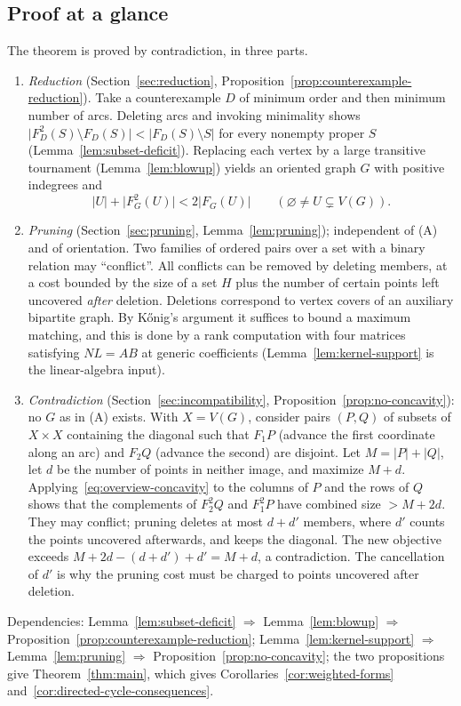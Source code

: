 \documentclass[11pt]{article}
\theoremstyle{remark}
\newcommand{\abs}[1]{\lvert #1\rvert}
\begin{document}
\subsection*{Proof at a glance}
The theorem is proved by contradiction, in three parts.
\begin{enumerate}[label=\textup{(\Alph*)},leftmargin=*]
\item \emph{Reduction} (Section~\ref{sec:reduction},
Proposition~\ref{prop:counterexample-reduction}). Take a counterexample $D$ of
minimum order and then minimum number of arcs. Deleting arcs and invoking
minimality shows $\abs{F_D^2(S)\setminus F_D(S)}<\abs{F_D(S)\setminus S}$ for
every nonempty proper $S$ (Lemma~\ref{lem:subset-deficit}). Replacing each
vertex by a large transitive tournament (Lemma~\ref{lem:blowup}) yields an
oriented graph $G$ with positive indegrees and
\begin{equation}\label{eq:overview-concavity}
 \abs{U}+\abs{F_G^2(U)}<2\abs{F_G(U)}\qquad(\varnothing\ne U\subsetneq V(G)).
\end{equation}
\item \emph{Pruning} (Section~\ref{sec:pruning}, Lemma~\ref{lem:pruning});
independent of (A) and of orientation. Two families of ordered pairs over a set
with a binary relation may ``conflict''. All conflicts can be removed by
deleting members, at a cost bounded by the size of a set $H$ plus the number of
certain points left uncovered \emph{after} deletion. Deletions correspond to
vertex covers of an auxiliary bipartite graph. By K\H{o}nig's argument it
suffices to bound a maximum matching, and this is done by a rank computation
with four matrices satisfying $NL=AB$ at generic coefficients
(Lemma~\ref{lem:kernel-support} is the linear-algebra input).
\item \emph{Contradiction} (Section~\ref{sec:incompatibility},
Proposition~\ref{prop:no-concavity}): no $G$ as in (A) exists. With $X=V(G)$,
consider pairs $(P,Q)$ of subsets of $X\times X$ containing the diagonal such
that $F_1P$ (advance the first coordinate along an arc) and $F_2Q$ (advance the
second) are disjoint. Let $M=\abs P+\abs Q$, let $d$ be the number of points in
neither image, and maximize $M+d$. Applying~\eqref{eq:overview-concavity} to
the columns of $P$ and the rows of $Q$ shows that the complements of $F_2^2Q$
and $F_1^2P$ have combined size $>M+2d$. They may conflict; pruning deletes at
most $d+d'$ members, where $d'$ counts the points uncovered afterwards, and
keeps the diagonal. The new objective exceeds $M+2d-(d+d')+d'=M+d$, a
contradiction. The cancellation of $d'$ is why the pruning cost must be charged
to points uncovered after deletion.
\end{enumerate}
Dependencies: Lemma~\ref{lem:subset-deficit} $\Rightarrow$
Lemma~\ref{lem:blowup} $\Rightarrow$
Proposition~\ref{prop:counterexample-reduction};
Lemma~\ref{lem:kernel-support} $\Rightarrow$ Lemma~\ref{lem:pruning}
$\Rightarrow$ Proposition~\ref{prop:no-concavity}; the two propositions give
Theorem~\ref{thm:main}, which gives Corollaries~\ref{cor:weighted-forms}
and~\ref{cor:directed-cycle-consequences}.
\end{document}
